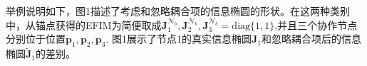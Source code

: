 举例说明如下，图1描述了考虑和忽略耦合项的信息椭圆的形状。在这两种类别中，从锚点获得的EFIM为简便取成$\bm{J}^{\mathcal{N}_b}_1,\bm{J}^{\mathcal{N}_b}_2,\bm{J}^{\mathcal{N}_b}_3=\text{diag}\{1,1\}$,并且三个协作节点分别位于位置$\bm{p}_1,\bm{p}_2,\bm{p}_3$.
图1展示了节点1的真实信息椭圆$\bm{J}_1$和忽略耦合项后的信息椭圆$\bm{\tilde{J}}_1$的差别。
%
%
%